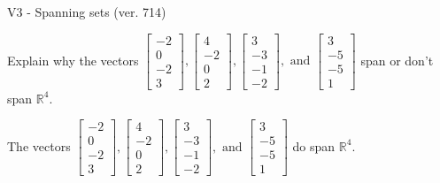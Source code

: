 \begin{exercise}
  \begin{exerciseTitle}V3 - Spanning sets (ver. 714)\end{exerciseTitle}
  \begin{exerciseStatement}
    Explain why the vectors \(\left[\begin{array}{r}
-2 \\
0 \\
-2 \\
3
\end{array}\right] , \left[\begin{array}{r}
4 \\
-2 \\
0 \\
2
\end{array}\right] , \left[\begin{array}{r}
3 \\
-3 \\
-1 \\
-2
\end{array}\right] , \text{ and } \left[\begin{array}{r}
3 \\
-5 \\
-5 \\
1
\end{array}\right]\) span or don't span \(\mathbb{R}^4\). 
	


  \end{exerciseStatement}
  \begin{exerciseAnswer}
   The vectors \(\left[\begin{array}{r}
-2 \\
0 \\
-2 \\
3
\end{array}\right] , \left[\begin{array}{r}
4 \\
-2 \\
0 \\
2
\end{array}\right] , \left[\begin{array}{r}
3 \\
-3 \\
-1 \\
-2
\end{array}\right] , \text{ and } \left[\begin{array}{r}
3 \\
-5 \\
-5 \\
1
\end{array}\right]\) 
  	 do  
	span \(\mathbb{R}^4\).
  


  \end{exerciseAnswer}
\end{exercise}